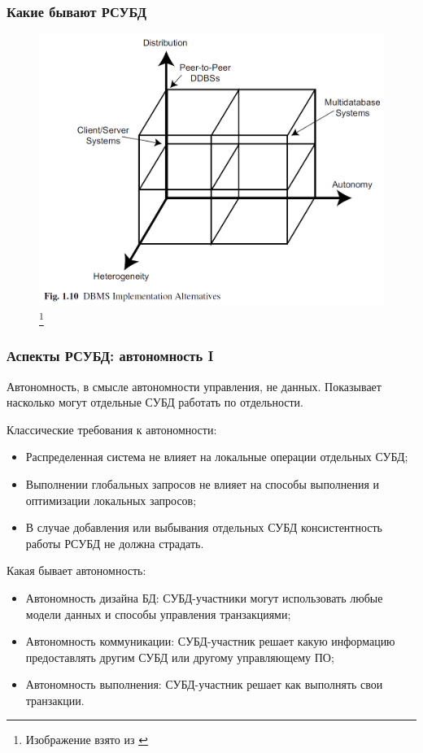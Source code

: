 \documentclass{beamer}
\begin{document}
\begin{frame}
\frametitle{Какие бывают РСУБД}

\begin{figure}[htb]
\includegraphics[width=\textwidth,height=0.80\textheight,keepaspectratio]{ozsu-4.png} 
\footnote{\tiny{Изображение взято из \cite{Ozsu2011}}}
\end{figure}

\end{frame}


\begin{frame}
\frametitle{Аспекты РСУБД: автономность I}
Автономность, в смысле автономности управления, не данных. Показывает насколько могут отдельные СУБД работать по отдельности.

Классические требования к автономности:
{\scriptsize
  \begin{itemize}
    \item Распределенная система не влияет на локальные операции отдельных СУБД;
    \item Выполнении глобальных запросов не влияет на способы выполнения и оптимизации локальных запросов;
    \item В случае добавления или выбывания отдельных СУБД консистентность работы РСУБД не должна страдать.
  \end{itemize}
}

Какая бывает автономность:
{\scriptsize
\begin{itemize}
  \item Автономность дизайна БД: СУБД-участники могут использовать любые модели данных и способы управления транзакциями;
  \item Автономность коммуникации: СУБД-участник решает какую информацию предоставлять другим СУБД или \alert{другому управляющему ПО};
  \item Автономность выполнения: СУБД-участник решает как выполнять свои транзакции.
\end{itemize}
}
\end{frame}
\end{document}
